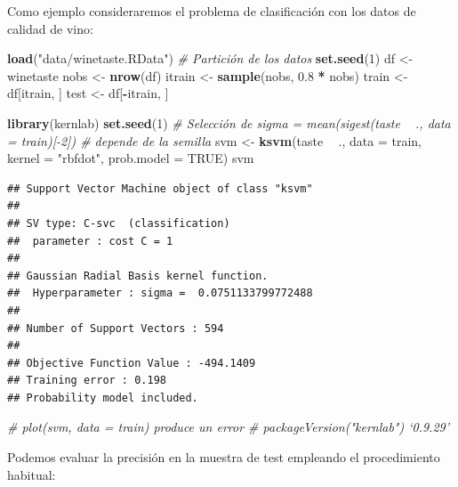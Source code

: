 \documentclass[
  spanish,
]{book}
\newenvironment{Shaded}{\begin{snugshade}}{\end{snugshade}}
\newcommand{\CommentTok}[1]{\textcolor[rgb]{0.56,0.35,0.01}{\textit{#1}}}
\newcommand{\DataTypeTok}[1]{\textcolor[rgb]{0.13,0.29,0.53}{#1}}
\newcommand{\DecValTok}[1]{\textcolor[rgb]{0.00,0.00,0.81}{#1}}
\newcommand{\FloatTok}[1]{\textcolor[rgb]{0.00,0.00,0.81}{#1}}
\newcommand{\KeywordTok}[1]{\textcolor[rgb]{0.13,0.29,0.53}{\textbf{#1}}}
\newcommand{\NormalTok}[1]{#1}
\newcommand{\OperatorTok}[1]{\textcolor[rgb]{0.81,0.36,0.00}{\textbf{#1}}}
\newcommand{\OtherTok}[1]{\textcolor[rgb]{0.56,0.35,0.01}{#1}}
\newcommand{\StringTok}[1]{\textcolor[rgb]{0.31,0.60,0.02}{#1}}
\theoremstyle{break}
\theoremstyle{definition}
\theoremstyle{definition}
\theoremstyle{definition}
\theoremstyle{remark}
\begin{document}
Como ejemplo consideraremos el problema de clasificación con los datos de calidad de vino:

\begin{Shaded}
\begin{Highlighting}[]
\KeywordTok{load}\NormalTok{(}\StringTok{"data/winetaste.RData"}\NormalTok{)}
\CommentTok{# Partición de los datos}
\KeywordTok{set.seed}\NormalTok{(}\DecValTok{1}\NormalTok{)}
\NormalTok{df <-}\StringTok{ }\NormalTok{winetaste}
\NormalTok{nobs <-}\StringTok{ }\KeywordTok{nrow}\NormalTok{(df)}
\NormalTok{itrain <-}\StringTok{ }\KeywordTok{sample}\NormalTok{(nobs, }\FloatTok{0.8} \OperatorTok{*}\StringTok{ }\NormalTok{nobs)}
\NormalTok{train <-}\StringTok{ }\NormalTok{df[itrain, ]}
\NormalTok{test <-}\StringTok{ }\NormalTok{df[}\OperatorTok{-}\NormalTok{itrain, ]}


\KeywordTok{library}\NormalTok{(kernlab)}
\KeywordTok{set.seed}\NormalTok{(}\DecValTok{1}\NormalTok{) }
\CommentTok{# Selección de sigma = mean(sigest(taste ~ ., data = train)[-2]) # depende de la semilla}
\NormalTok{svm <-}\StringTok{ }\KeywordTok{ksvm}\NormalTok{(taste }\OperatorTok{~}\StringTok{ }\NormalTok{., }\DataTypeTok{data =}\NormalTok{ train,}
            \DataTypeTok{kernel =} \StringTok{"rbfdot"}\NormalTok{, }\DataTypeTok{prob.model =} \OtherTok{TRUE}\NormalTok{)}
\NormalTok{svm}
\end{Highlighting}
\end{Shaded}

\begin{verbatim}
## Support Vector Machine object of class "ksvm" 
## 
## SV type: C-svc  (classification) 
##  parameter : cost C = 1 
## 
## Gaussian Radial Basis kernel function. 
##  Hyperparameter : sigma =  0.0751133799772488 
## 
## Number of Support Vectors : 594 
## 
## Objective Function Value : -494.1409 
## Training error : 0.198 
## Probability model included.
\end{verbatim}

\begin{Shaded}
\begin{Highlighting}[]
\CommentTok{# plot(svm, data = train) produce un error # packageVersion("kernlab") ‘0.9.29’}
\end{Highlighting}
\end{Shaded}

Podemos evaluar la precisión en la muestra de test empleando el procedimiento habitual:

\begin{Shaded}
\end{Shaded}
\end{document}
